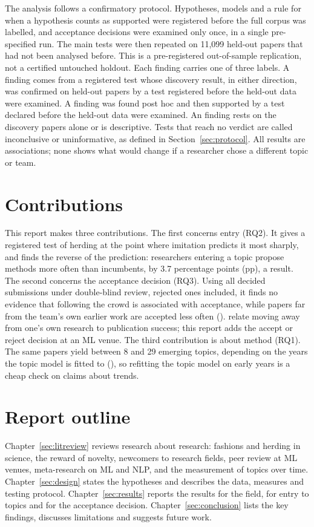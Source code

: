 The analysis follows a confirmatory protocol. Hypotheses, models and a rule for when a hypothesis counts as supported
were registered before the full corpus was labelled, and acceptance decisions were examined only once, in a single
pre-specified run. The main tests were then repeated on 11,099 held-out papers that had not been analysed before. This
is a pre-registered out-of-sample replication, not a certified untouched holdout. Each finding carries one of three
labels. A  finding comes from a registered test whose discovery result, in either direction, was
confirmed on held-out papers by a test registered before the held-out data were examined. A 
finding was found post hoc and then supported by a test declared before the held-out data were examined. An
 finding rests on the discovery papers alone or is descriptive. Tests that reach no verdict are called
inconclusive or uninformative, as defined in Section~\ref{sec:protocol}. All results are associations; none shows what
would change if a researcher chose a different topic or team.

\section{Contributions}

This report makes three contributions. The first concerns entry (RQ2). It gives a registered test of herding at the
point where imitation predicts it most sharply, and finds the reverse of the prediction: researchers entering a topic
propose methods more often than incumbents, by 3.7 percentage points (pp), a  result. The second
concerns the acceptance decision (RQ3). Using all decided submissions under double-blind review, rejected ones
included, it finds no evidence that following the crowd is associated with acceptance, while papers far from the team's
own earlier work are accepted less often (). \citet{hill2025pivot} relate moving away from
one's own research to publication success; this report adds the accept or reject decision at an ML venue. The third
contribution is about method (RQ1). The same papers yield between 8 and 29 emerging topics, depending on the years the
topic model is fitted to (), so refitting the topic model on early years is a cheap check on claims
about trends.

\section{Report outline}

Chapter~\ref{sec:litreview} reviews research about research: fashions and herding in science, the reward of novelty,
newcomers to research fields, peer review at ML venues, meta-research on ML and NLP, and the measurement of topics over
time. Chapter~\ref{sec:design} states the hypotheses and describes the data, measures and testing protocol.
Chapter~\ref{sec:results} reports the results for the field, for entry to topics and for the acceptance decision.
Chapter~\ref{sec:conclusion} lists the key findings, discusses limitations and suggests future work.
